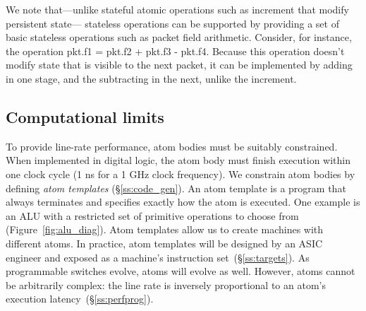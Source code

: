We note that---unlike stateful atomic operations such as increment
that modify persistent state--- stateless operations can be supported
by providing a set of basic stateless operations such as packet field
arithmetic. Consider, for instance, the operation pkt.f1 = pkt.f2 +
pkt.f3 - pkt.f4. Because this operation doesn't modify state that is
visible to the next packet, it can be implemented by adding in one
stage, and the subtracting in the next, unlike the increment.

\subsection{Computational limits}
\label{s:atomConstraints}


To provide line-rate performance, atom bodies must be suitably
constrained.  When implemented in digital logic, the atom body must
finish execution within one clock cycle (1 ns for a 1 GHz clock
frequency). We constrain atom bodies by defining {\it atom templates}
(\S\ref{ss:code_gen}).  An atom template is a program that always
terminates and specifies exactly how the atom is executed. One example
is an ALU with a restricted set of primitive operations to choose from
(Figure~\ref{fig:alu_diag}). Atom templates allow us to create
\absmachine machines with different atoms.  In practice, atom
templates will be designed by an ASIC engineer and exposed as a
machine's instruction set~(\S\ref{ss:targets}).  As programmable
switches evolve, atoms will evolve as well.  However, atoms cannot be
arbitrarily complex: the line rate is inversely proportional to an
atom's execution latency~(\S\ref{ss:perfprog}).

